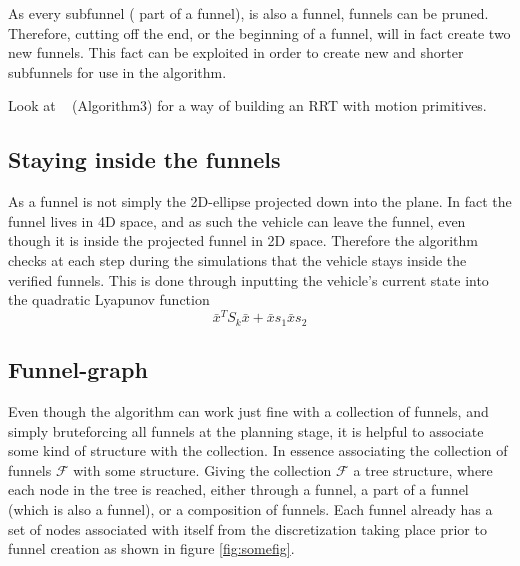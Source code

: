 As every subfunnel (\ie{} part of a funnel), is also a funnel, funnels can be
pruned. Therefore, cutting off the end, or the beginning of a funnel, will in
fact create two new funnels. This fact can be exploited in order to create new
and shorter subfunnels for use in the \rrtfunnel{} algorithm.

Look at ~\cite{vonasekGlobalMotionPlanning2013} (Algorithm3) for a way of
building an RRT with motion primitives.

\subsection{Staying inside the funnels}

As a funnel is not simply the 2D-ellipse projected down into the plane. In fact
the funnel lives in 4D space, and as such the vehicle can leave the funnel, even
though it is inside the projected funnel in 2D space. Therefore the \rrtfunnel{}
algorithm checks at each step during the simulations that the vehicle stays
inside the verified funnels. This is done through inputting the vehicle's
current state into the quadratic Lyapunov function
\[
  {\bar{x}}^{T}S_{k}\bar{x} + \bar{x}s_{1} \bar{x} s_{2}
\]

\subsection{Funnel-graph}

Even though the \rrtfunnel{} algorithm can work just fine with a collection of
funnels, and simply bruteforcing all funnels at the planning stage, it is
helpful to associate some kind of structure with the collection. In essence
associating the collection of funnels \(\mathcal{F}\) with some structure.
Giving the collection \(\mathcal{F}\) a tree structure, where each node in the
tree is reached, either through a funnel, a part of a funnel (which is also a
funnel), or a composition of funnels. Each funnel already has a set of nodes
associated with itself from the discretization taking place prior to funnel
creation as shown in figure \ref{fig:somefig}.

